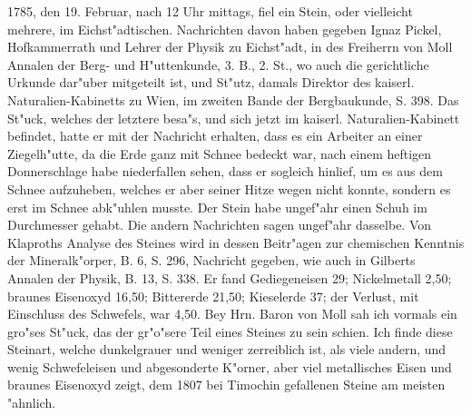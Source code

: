 \documentclass[a4paper, 11pt, oneside, polutonikogreek, german]{article}
\begin{document}
1785, den 19. Februar, nach 12 Uhr mittags, fiel ein Stein, oder vielleicht mehrere, im Eichst"adtischen. Nachrichten davon haben gegeben Ignaz Pickel, Hofkammerrath und Lehrer der Physik zu Eichst"adt, in des Freiherrn von Moll Annalen der Berg- und H"uttenkunde, 3. B., 2. St., wo auch die gerichtliche Urkunde dar"uber mitgeteilt ist, und St"utz, damals Direktor des kaiserl. Naturalien-Kabinetts zu Wien, im zweiten Bande der Bergbaukunde, S. 398. Das St"uck, welches der letztere besa"s, und sich jetzt im kaiserl. Naturalien-Kabinett befindet, hatte er mit der Nachricht erhalten, dass es ein Arbeiter an einer Ziegelh"utte, da die Erde ganz mit Schnee bedeckt war, nach einem heftigen Donnerschlage habe niederfallen sehen, dass er sogleich hinlief, um es aus dem Schnee aufzuheben, welches er aber seiner Hitze wegen nicht konnte, sondern es erst im Schnee abk"uhlen musste. Der Stein habe ungef"ahr einen Schuh im Durchmesser gehabt. Die andern Nachrichten sagen ungef"ahr dasselbe. Von Klaproths Analyse des Steines wird in dessen Beitr"agen zur chemischen Kenntnis der Mineralk"orper, B. 6, S. 296, Nachricht gegeben, wie auch in Gilberts Annalen der Physik, B. 13, S. 338. Er fand Gediegeneisen 29; Nickelmetall 2,50; braunes Eisenoxyd 16,50; Bittererde 21,50; Kieselerde 37; der Verlust, mit Einschluss des Schwefels, war 4,50. Bey Hrn. Baron von Moll sah ich vormals ein gro"ses St"uck, das der gr"o"sere Teil eines Steines zu sein schien. Ich finde diese Steinart, welche dunkelgrauer und weniger zerreiblich ist, als viele andern, und wenig Schwefeleisen und abgesonderte K"orner, aber viel metallisches Eisen und braunes Eisenoxyd zeigt, dem 1807 bei Timochin gefallenen Steine am meisten "ahnlich.
\end{document}
